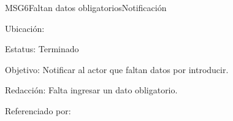 \begin{mensaje}{MSG6}{Faltan datos obligatorios}{Notificación}
	\item[Ubicación:] \msjEmergente
	\item[Estatus:] Terminado
	\item[Objetivo:] Notificar al actor que faltan datos por introducir.
	\item[Redacción:] Falta ingresar un dato obligatorio.
	\item[Referenciado por:] 
\end{mensaje}
